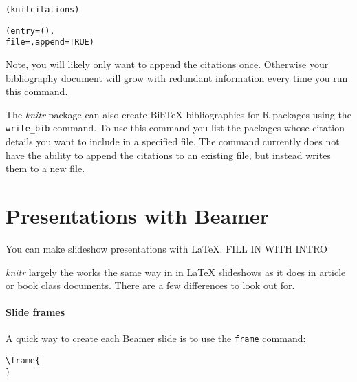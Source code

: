 \begin{knitrout}
\color{fgcolor}\begin{kframe}
\begin{alltt}
(knitcitations)
 
(entry = (), 
              file = , append = TRUE)
\end{alltt}
\end{kframe}
\end{knitrout}


\noindent Note, you will likely only want to append the citations once. Otherwise your bibliography document will grow with redundant information every time you run this command.

The {\emph{knitr}} package can also create BibTeX bibliographies for R packages using the \texttt{write\_bib} command. To use this command you list the packages whose citation details you want to include in a specified file. The command currently does not have the ability to append the citations to an existing file, but instead writes them to a new file.

\section{Presentations with Beamer}

You can make slideshow presentations with LaTeX. FILL IN WITH INTRO

{\emph{knitr}} largely the works the same way in in LaTeX slideshows as it does in article or book class documents. There are a few differences to look out for. 

\paragraph{Slide frames}

A quick way to create each Beamer slide is to use the \texttt{frame} command:

\begin{knitrout}
\color{fgcolor}\begin{kframe}
\begin{alltt}
\textbackslash{}frame\{
\}
\end{alltt}
\end{kframe}
\end{knitrout}


